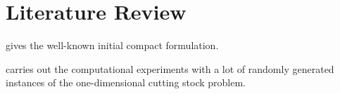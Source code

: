 \section{Literature Review}

\cite{gilmore1961linear} gives the well-known initial compact formulation.

\cite{scheithauer1995modified} carries out the computational experiments with a lot of randomly generated instances of the one-dimensional cutting stock problem. 


%
%
% 




\newpage
